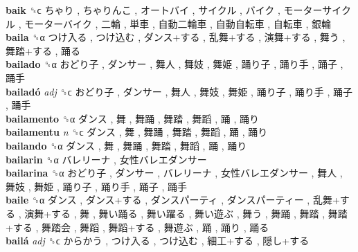 \textbf{baik} ␝ϲ   ちゃり ,  ちゃりんこ ,  オートバイ ,  サイクル ,  バイク ,  モーターサイクル ,  モーターバイク ,  二輪 ,  単車 ,  自動二輪車 ,  自動自転車 ,  自転車 ,  銀輪   \\
\textbf{baila} ␝α   つけ入る ,  つけ込む ,  ダンス+する ,  乱舞+する ,  演舞+する ,  舞う ,  舞踏+する ,  踊る   \\
\textbf{bailado} ␝α   おどり子 ,  ダンサー ,  舞人 ,  舞妓 ,  舞姫 ,  踊り子 ,  踊り手 ,  踊子 ,  踊手   \\
\textbf{bailadó} \emph{adj}  ␝ϲ   おどり子 ,  ダンサー ,  舞人 ,  舞妓 ,  舞姫 ,  踊り子 ,  踊り手 ,  踊子 ,  踊手   \\
\textbf{bailamento} ␝α   ダンス ,  舞 ,  舞踊 ,  舞踏 ,  舞蹈 ,  踊 ,  踊り   \\
\textbf{bailamentu} \emph{n}  ␝ϲ   ダンス ,  舞 ,  舞踊 ,  舞踏 ,  舞蹈 ,  踊 ,  踊り   \\
\textbf{bailando} ␝α   ダンス ,  舞 ,  舞踊 ,  舞踏 ,  舞蹈 ,  踊 ,  踊り   \\
\textbf{bailarin} ␝α   バレリーナ ,  女性バレエダンサー   \\
\textbf{bailarina} ␝α   おどり子 ,  ダンサー ,  バレリーナ ,  女性バレエダンサー ,  舞人 ,  舞妓 ,  舞姫 ,  踊り子 ,  踊り手 ,  踊子 ,  踊手   \\
\textbf{baile} ␝α   ダンス ,  ダンス+する ,  ダンスパーティ ,  ダンスパーティー ,  乱舞+する ,  演舞+する ,  舞 ,  舞い踊る ,  舞い躍る ,  舞い遊ぶ ,  舞う ,  舞踊 ,  舞踏 ,  舞踏+する ,  舞踏会 ,  舞蹈 ,  舞蹈+する ,  舞遊ぶ ,  踊 ,  踊り ,  踊る   \\
\textbf{bailá} \emph{adj}  ␝ϲ   からかう ,  つけ入る ,  つけ込む ,  細工+する ,  隠し+する   \\
